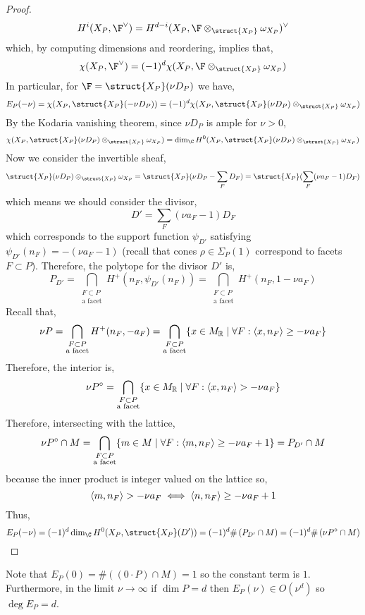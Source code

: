 \documentclass[12pt]{article}
\begin{document}
\begin{proof}
\[ H^i(X_P, \F^\vee) = H^{d - i}(X_P, \F \otimes_{\struct{X_P}} \omega_{X_P})^\vee \]
which, by computing dimensions and reordering, implies that,
\[ \chi(X_P, \F^\vee) = (-1)^d \chi(X_P, \F \otimes_{\struct{X_P}} \omega_{X_P}) \]
In particular, for $\F = \struct{X_P}(\nu D_P)$ we have,
\[ E_P(-\nu) = \chi(X_P, \struct{X_P}(- \nu D_P)) = (-1)^d \chi(X_P, \struct{X_P}(\nu D_P) \otimes_{\struct{X_P}} \omega_{X_P}) \]
By the Kodaria vanishing theorem, since $\nu D_P$ is ample for $\nu > 0$, 
\[ \chi(X_P, \struct{X_P}(\nu D_P) \otimes_{\struct{X_P}} \omega_{X_P}) = \dim_\C H^0(X_P, \struct{X_P}(\nu D_P) \otimes_{\struct{X_P}} \omega_{X_P}) \]
Now we consider the invertible sheaf,
\[ \struct{X_P}(\nu D_P) \otimes_{\struct{X_P}} \omega_{X_P} = \struct{X_P}(\nu D_P - \sum_F D_F) = \struct{X_P}(\sum_F (\nu a_F - 1) D_F) \]
which means we should consider the divisor,
\[ D' = \sum_F (\nu a_F - 1) D_F \]
which corresponds to the support function $\psi_{D'}$ satisfying $\psi_{D'}(n_F) = -(\nu a_F - 1)$ (recall that cones $\rho \in \Sigma_P(1)$ correspond to facets $F \subset P$). Therefore, the polytope for the divisor $D'$ is,
\[ P_{D'} = \bigcap_{\substack{F \subset P \\ \text{a facet}}} H^+(n_F, \psi_{D'}(n_F)) = \bigcap_{\substack{F \subset P \\ \text{a facet}}} H^+(n_F, 1 - \nu a_F) \]
Recall that,
\[ \nu P = \bigcap_{\substack{F \subset P \\ \text{a facet}}} H^+(n_F, -a_F) = \bigcap_{\substack{F \subset P \\ \text{a facet}}} \{ x \in M_{\mathbb{R}} \mid \forall F : \left< x, n_F \right> \ge - \nu a_F \} \]
Therefore, the interior is,
\[ \nu P^\circ  = \bigcap_{\substack{F \subset P \\ \text{a facet}}} \{ x \in M_{\mathbb{R}} \mid \forall F : \left< x, n_F \right> > - \nu a_F \} \]
Therefore, intersecting with the lattice,
\[ \nu P^\circ \cap M = \bigcap_{\substack{F \subset P \\ \text{a facet}}} \{ m \in M \mid \forall F : \left< m, n_F \right> \ge - \nu a_F + 1 \} = P_{D'} \cap M \]
because the inner product is integer valued on the lattice so,
\[ \left< m, n_F \right> > - \nu a_F \iff \left< n, n_F \right> \ge - \nu a_F + 1 \]
Thus,
\[ E_P(-\nu) = (-1)^d \dim_{\C} H^0(X_P, \struct{X_P}(D')) = (-1)^d \# \left( P_{D'} \cap M \right) = (-1)^d \# \left( \nu P^\circ \cap M \right) \]
\end{proof}

\begin{remark}
Note that $E_P(0) = \#((0 \cdot P) \cap M) = 1$ so the constant term is $1$. Furthermore, in the limit $\nu \to \infty$ if $\dim{P} = d$ then $E_P(\nu) \in O(\nu^d)$ so $\deg{E_P} = d$.  
\end{remark}
\end{document}
